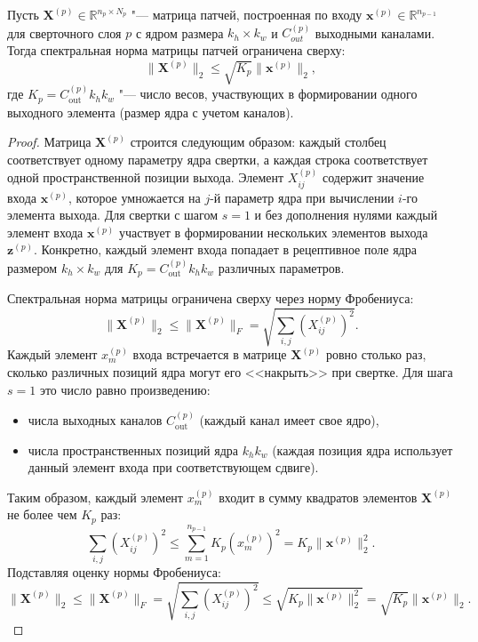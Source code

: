 \begin{lemma}
    \label{lemma:patch-norm}
    Пусть $\mathbf{X}^{(p)} \in \mathbb{R}^{n_p \times N_p}$ "--- матрица патчей, построенная по входу $\mathbf{x}^{(p)} \in \mathbb{R}^{n_{p-1}}$ для сверточного слоя $p$ с ядром размера $k_h \times k_w$ и $C_{out}^{(p)}$ выходными каналами. Тогда спектральная норма матрицы патчей ограничена сверху:
    \begin{equation}
        \|\mathbf{X}^{(p)}\|_2 \leqslant \sqrt{K_p}  \|\mathbf{x}^{(p)}\|_2,
    \end{equation}
    где $K_p = C_{\text{out}}^{(p)} k_h k_w$ "--- число весов, участвующих в формировании одного выходного элемента (размер ядра с учетом каналов).
\end{lemma}
\begin{proof}
    Матрица $\mathbf{X}^{(p)}$ строится следующим образом: каждый столбец соответствует одному параметру ядра свертки, а каждая строка соответствует одной пространственной позиции выхода. Элемент $X^{(p)}_{ij}$ содержит значение входа $\mathbf{x}^{(p)}$, которое умножается на $j$-й параметр ядра при вычислении $i$-го элемента выхода. Для свертки с шагом $s=1$ и без дополнения нулями каждый элемент входа $\mathbf{x}^{(p)}$ участвует в формировании нескольких элементов выхода $\mathbf{z}^{(p)}$. Конкретно, каждый элемент входа попадает в рецептивное поле ядра размером $k_h \times k_w$ для $K_p = C_{\text{out}}^{(p)} k_h k_w$ различных параметров.
    
    Спектральная норма матрицы ограничена сверху через норму Фробениуса:
    \begin{equation}
        \|\mathbf{X}^{(p)}\|_2 \leqslant \|\mathbf{X}^{(p)}\|_F = \sqrt{\sum_{i, j} \left(X^{(p)}_{ij}\right)^2}.
    \end{equation}
    Каждый элемент $x^{(p)}_m$ входа встречается в матрице $\mathbf{X}^{(p)}$ ровно столько раз, сколько различных позиций ядра могут его <<накрыть>> при свертке. Для шага $s=1$ это число равно произведению:
    \begin{itemize}
        \item числа выходных каналов $C_{\text{out}}^{(p)}$ (каждый канал имеет свое ядро),
        \item числа пространственных позиций ядра $k_h k_w$ (каждая позиция ядра использует данный элемент входа при соответствующем сдвиге).
    \end{itemize}
    Таким образом, каждый элемент $x^{(p)}_m$ входит в сумму квадратов элементов $\mathbf{X}^{(p)}$ не более чем $K_p$ раз:
    \begin{equation}
        \sum_{i, j} \left(X^{(p)}_{ij}\right)^2 \leqslant \sum_{m=1}^{n_{p-1}} K_p \left(x^{(p)}_m\right)^2 = K_p \|\mathbf{x}^{(p)}\|_2^2.
    \end{equation}
    Подставляя оценку нормы Фробениуса:
    \begin{equation}
        \|\mathbf{X}^{(p)}\|_2 \leqslant \|\mathbf{X}^{(p)}\|_F = \sqrt{\sum_{i, j} \left(X^{(p)}_{ij}\right)^2} \leqslant \sqrt{K_p \|\mathbf{x}^{(p)}\|_2^2} = \sqrt{K_p}  \|\mathbf{x}^{(p)}\|_2.
    \end{equation}
\end{proof}

